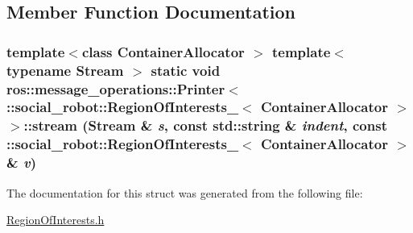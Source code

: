 \subsection{Member Function Documentation}
\hypertarget{structros_1_1message__operations_1_1Printer_3_01_1_1social__robot_1_1RegionOfInterests___3_01ContainerAllocator_01_4_01_4_ac0d7193e5dd4b2ab332875d8d2fef3cd}{
\subsubsection[{stream}]{\setlength{\rightskip}{0pt plus 5cm}template$<$class ContainerAllocator $>$ template$<$typename Stream $>$ static void ros::message\_\-operations::Printer$<$ ::{\bf social\_\-robot::RegionOfInterests\_\-}$<$ ContainerAllocator $>$ $>$::stream (Stream \& {\em s}, \/  const std::string \& {\em indent}, \/  const ::{\bf social\_\-robot::RegionOfInterests\_\-}$<$ ContainerAllocator $>$ \& {\em v})}}
\label{structros_1_1message__operations_1_1Printer_3_01_1_1social__robot_1_1RegionOfInterests___3_01ContainerAllocator_01_4_01_4_ac0d7193e5dd4b2ab332875d8d2fef3cd}


The documentation for this struct was generated from the following file:\begin{DoxyCompactItemize}
\item 
\hyperlink{RegionOfInterests_8h}{RegionOfInterests.h}\end{DoxyCompactItemize}
